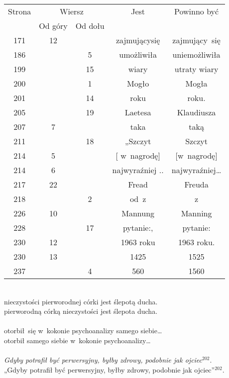 \documentclass[a4paper,11pt]{article}
\numberwithin{equation}{section}
\begin{document}
\begin{center}
  \begin{tabular}{|c|c|c|c|c|}
    \hline
    Strona & \multicolumn{2}{c|}{Wiersz} & Jest
                              & Powinno być \\ \cline{2-3}
    & Od góry & Od dołu & & \\
    \hline
    171 & 12 & & zajmującysię & zajmujący~się \\
    186 & &  5 & umożliwiła & uniemożliwiła \\
    199 & & 15 & wiary & utraty wiary \\
    200 & &  1 & Mogło & Mogła \\
    201 & & 14 & roku & roku. \\
    205 & & 19 & Laetesa & Klaudiusza \\
    207 &  7 & & taka & taką \\
    211 & & 18 & „Szczyt & Szczyt \\
    214 &  5 & & [ w~nagrodę] & [w~nagrodę] \\
    214 &  6 & & najwyraźniej .. & najwyraźniej\ldots \\
    217 & 22 & & Fread & Freuda \\
    218 & &  2 & od~z & z \\
    226 & 10 & & Mannung & Manning \\
    228 & & 17 & pytanie:, & pytanie: \\
    230 & 12 & & 1963 roku & 1963 roku. \\
    230 & 13 & & 1425 & 1525 \\
    237 & &  4 & 560 & 1560 \\
    \hline
  \end{tabular}

\end{center}

\VerSpaceTwo


\noindent
{} \\
\Jest nieczystości pierworodnej córki jest ślepotą ducha. \\
\PowinnoByc pierworodną córką nieczystości jest ślepota ducha. \\
 \\
\Jest otorbił~się w~kokonie psychoanalizy samego siebie\ldots \\
\PowinnoByc otorbił samego siebie w~kokonie psychoanalizy\ldots \\
 \\
\Jest \textit{Gdyby potrafił być perwersyjny, byłby zdrowy, podobnie jak
  ojciec$^{ 202 }$}. \\
\PowinnoByc „Gdyby potrafił być perwersyjny, byłby zdrowy,
podobnie jak ojciec”$^{ 202 }$. \\
\end{document}
